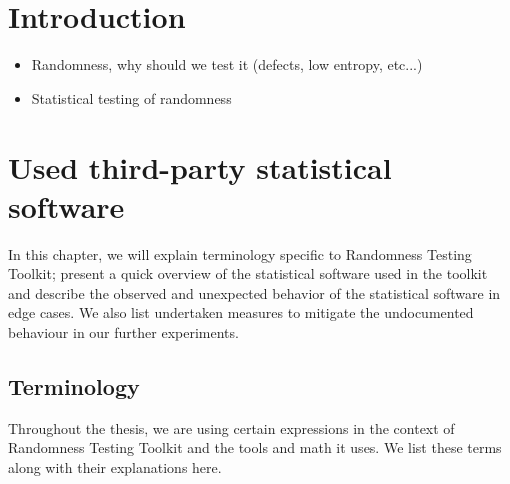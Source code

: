 \documentclass[
  digital,  	%
  color,		%
  oneside,   	%
  12pt,
  nocover,
  notable,
  nolof,
  nolot,
]{fithesis3}
\theoremstyle{definition}
\theoremstyle{remark}
\begin{document}
\chapter{Introduction}
\begin{itemize}
\item Randomness, why should we test it (defects, low entropy, etc...)
\item Statistical testing of randomness
\end{itemize}

\chapter{Used third-party statistical software}
\label{chap:batteries}
In this chapter, we will explain terminology specific to Randomness Testing Toolkit; present a quick overview of the statistical software used in the toolkit and describe the observed and unexpected behavior of the statistical software in edge cases. We also list undertaken measures to mitigate the undocumented behaviour in our further experiments.

\section{Terminology}
Throughout the thesis, we are using certain expressions in the context of Randomness Testing Toolkit and the tools and math it uses. We list these terms along with their explanations here.
\end{document}
